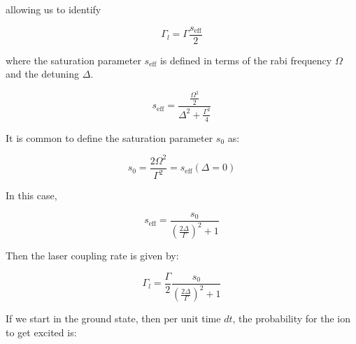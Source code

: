 \documentclass[a4paper,10pt]{article}
\begin{document}
allowing us to identify

\begin{equation}
\Gamma_l = \Gamma \frac{s_{\text{eff}}}{2} 
\end{equation}

where the saturation parameter $s_{\text{eff}}$ is defined in terms of the rabi frequency $\Omega$ and the detuning $\Delta$.

\begin{equation}
s_{\text{eff}} = \frac{\frac{\Omega^2}{2}}{\Delta^2 + \frac{\Gamma^2}{4}}
\end{equation}

It is common to define the saturation parameter $s_0$ as:

\begin{equation}
s_0 = \frac{2 \Omega^2}{\Gamma^2} = s_{\text{eff}} \left(\Delta = 0 \right)
\end{equation}

In this case,

\begin{equation}
s_{\text{eff}} = \frac{s_0}{\left(\frac{2 \Delta}{\Gamma}\right)^2 + 1}
\end{equation}

Then the laser coupling rate is given by:

\begin{equation}
 \Gamma_l = \frac{\Gamma}{2} \frac{s_0}{\left(\frac{2 \Delta}{\Gamma}\right)^2 + 1}
\end{equation}

If we start in the ground state, then per unit time $dt$, the probability for the ion to get excited is:
\end{document}
